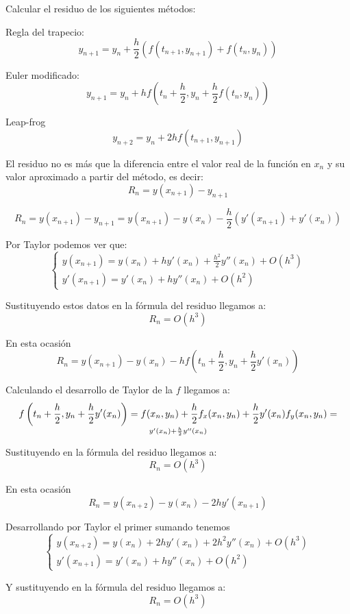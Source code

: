 \begin{problem}[4]
Calcular el residuo de los siguientes métodos:

\ppart Regla del trapecio:
\[y_{n+1} = y_n + \frac{h}{2}\left( f(t_{n+1},y_{n+1})+f(t_n,y_n)\right)\]

\ppart Euler modificado:
\[y_{n+1} = y_n +hf\left( t_n+\frac{h}{2}, y_n+\frac{h}{2}f(t_n,y_n)\right)\]

\ppart Leap-frog
\[y_{n+2}=y_n+2hf(t_{n+1},y_{n+1})\]
\solution


El residuo no es más que la diferencia entre el valor real de la función en $x_n$ y su valor aproximado a partir del método, es decir:
\[R_n = y(x_{n+1})-y_{n+1}\]

\spart
\[R_n = y(x_{n+1})-y_{n+1} = y(x_{n+1})-y(x_n) - \frac{h}{2}\left( y'(x_{n+1})+y'(x_n)\right)\]

Por Taylor podemos ver que:
\[\left\{\begin{array}{l}
y(x_{n+1}) = y(x_n)+hy'(x_n)+\frac{h^2}{2}y''(x_n)+O(h^3) \\
y'(x_{n+1}) = y'(x_n)+hy''(x_n) +O(h^2)
\end{array}\right.\]

Sustituyendo estos datos en la fórmula del residuo llegamos a:
\[R_n = O(h^3)\]

\spart

En esta ocasión
\[R_n = y(x_{n+1})-y(x_n)-hf\left( t_n+\frac{h}{2}, y_n+\frac{h}{2}y'(x_n)\right)\]

Calculando el desarrollo de Taylor de la $f$ llegamos a:
\[f\left( t_n+\frac{h}{2}, y_n+\frac{h}{2}y'(x_n)\right) = f(x_n,y_n)+\frac{h}{2}f_x(x_n,y_n)+\frac{h}{2}y'(x_n)f_y(x_n,y_n)= \atop y'(x_n)+\frac{h}{2}y''(x_n)\]

Sustituyendo en la fórmula del residuo llegamos a:
\[R_n = O(h^3)\]

\spart

En esta ocasión
\[R_n = y(x_{n+2})-y(x_n)-2hy'(x_{n+1})\]

Desarrollando por Taylor el primer sumando tenemos 
\[\left\{ \begin{array}{l}
y(x_{n+2}) = y(x_n) + 2hy'(x_n)+2h^2y''(x_n)+O(h^3) \\
y'(x_{n+1}) = y'(x_n)+hy''(x_n) + O(h^2)
\end{array}\right.\]

Y sustituyendo en la fórmula del residuo llegamos a:
\[R_n=O(h^3)\]


\end{problem}

